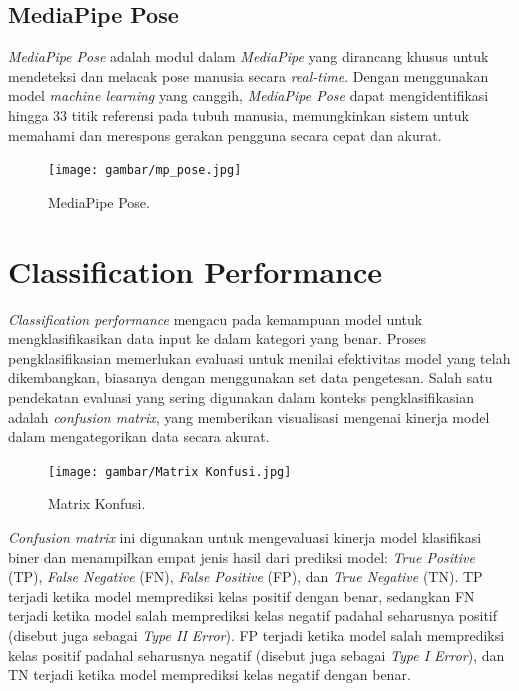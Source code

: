 \subsection{MediaPipe Pose}
\label{subsec:MediaPipe Pose}

\emph{MediaPipe Pose} adalah modul dalam \emph{MediaPipe} yang dirancang khusus untuk mendeteksi dan melacak pose manusia secara \emph{real-time}. Dengan menggunakan model \emph{machine learning} yang canggih, \emph{MediaPipe Pose} dapat mengidentifikasi hingga 33 titik referensi pada tubuh manusia, memungkinkan sistem untuk memahami dan merespons gerakan pengguna secara cepat dan akurat.

\begin{figure}[H]
  \centering
  \texttt{[image: gambar/mp\_pose.jpg]}
  \caption{MediaPipe Pose.}
  \label{fig:mp_pose}
\end{figure}

\section{Classification Performance}
\label{sec:Classification Performance}

\emph{Classification performance} mengacu pada kemampuan model untuk mengklasifikasikan data input ke dalam kategori yang benar. Proses pengklasifikasian memerlukan evaluasi untuk menilai efektivitas model yang telah dikembangkan, biasanya dengan menggunakan set data pengetesan. Salah satu pendekatan evaluasi yang sering digunakan dalam konteks pengklasifikasian adalah \emph{confusion matrix}, yang memberikan visualisasi mengenai kinerja model dalam mengategorikan data secara akurat.

\begin{figure}[H]
  \centering
  \texttt{[image: gambar/Matrix Konfusi.jpg]}
  \caption{Matrix Konfusi.}
  \label{fig:confusion}
\end{figure}

\emph{Confusion matrix} ini digunakan untuk mengevaluasi kinerja model klasifikasi biner dan menampilkan empat jenis hasil dari prediksi model: \emph{True Positive} (TP), \emph{False Negative} (FN), \emph{False Positive} (FP), dan \emph{True Negative} (TN). TP terjadi ketika model memprediksi kelas positif dengan benar, sedangkan FN terjadi ketika model salah memprediksi kelas negatif padahal seharusnya positif (disebut juga sebagai \emph{Type II Error}). FP terjadi ketika model salah memprediksi kelas positif padahal seharusnya negatif (disebut juga sebagai \emph{Type I Error}), dan TN terjadi ketika model memprediksi kelas negatif dengan benar.

